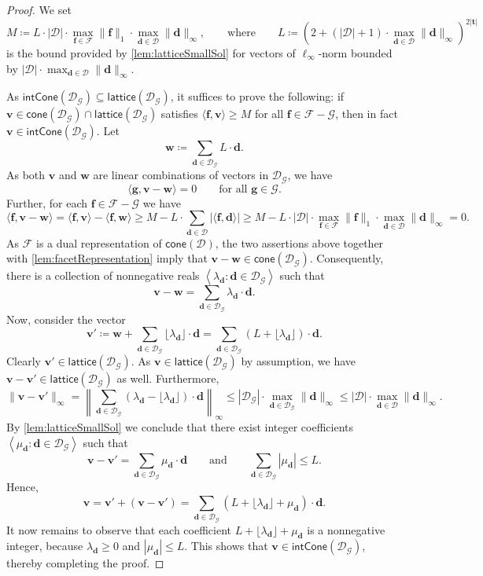 \documentclass{theoretics}
\renewcommand{\leq}{\leqslant}
\renewcommand{\geq}{\geqslant}
\newcommand{\Dd}{\mathcal{D}}
\newcommand{\tup}[1]{{\mathbf{#1}}}
\newcommand{\ww}{\tup w}
\newcommand{\tv}{\tup t}
\newcommand{\ff}{\tup f}
\renewcommand{\gg}{\tup g}
\newcommand{\dd}{\tup d}
\newcommand{\myvv}{\tup v} %
\newcommand{\mset}[1]{\left\langle #1\right\rangle}
\newcommand{\Ff}{\mathcal{F}}
\newcommand{\Gg}{\mathcal{G}}
\newcommand{\sca}[2]{\langle #1,#2\rangle}
\renewcommand{\setminus}{-}
\newcommand{\realcone}{\mathsf{cone}}
\newcommand{\intcone}{\mathsf{intCone}}
\newcommand{\lattice}{\mathsf{lattice}}
\begin{document}
\begin{proof}
 We set
 $$M\coloneqq L\cdot |\Dd|\cdot \max_{\ff\in \Ff}\|\ff\|_1\cdot \max_{\dd\in \Dd} \|\dd\|_\infty,\qquad \textrm{where}\qquad L\coloneqq \left(2+(|\Dd|+1)\cdot \max_{\dd\in \Dd} \|\dd\|_\infty\right)^{2|\tv|}$$
 is the bound provided by \cref{lem:latticeSmallSol} for vectors of $\ell_\infty$-norm bounded by $|\Dd|\cdot \max_{\dd\in \Dd} \|\dd\|_\infty$.

 As $\intcone(\Dd_\Gg)\subseteq \lattice(\Dd_\Gg)$, it suffices to prove the following: if $\myvv\in \realcone(\Dd_\Gg)\cap \lattice(\Dd_\Gg)$ satisfies $\sca{\ff}{\myvv}\geq M$ for all $\ff\in \Ff\setminus \Gg$, then in fact $\myvv\in \intcone(\Dd_\Gg)$. Let
 $$\ww\coloneqq \sum_{\dd\in \Dd_\Gg} L\cdot \dd.$$
 As both $\myvv$ and $\ww$ are linear combinations of vectors in $\Dd_\Gg$, we have
 $$\sca{\gg}{\myvv-\ww}=0\qquad\textrm{for all }\gg\in \Gg.$$
 Further, for each $\ff\in \Ff\setminus \Gg$ we have
 $$\sca{\ff}{\myvv-\ww}=\sca{\ff}{\myvv}-\sca{\ff}{\ww}\geq M-L\cdot \sum_{\dd\in \Dd} |\sca{\ff}{\dd}|\geq M-L\cdot |\Dd|\cdot \max_{\ff\in \Ff}\|\ff\|_1\cdot \max_{\dd\in \Dd} \|\dd\|_\infty=0.$$
 As $\Ff$ is a dual representation of $\realcone(\Dd)$, the two assertions above together with \cref{lem:facetRepresentation} imply that $\myvv-\ww\in \realcone(\Dd_\Gg)$. Consequently, there is a collection of nonnegative reals $\mset{\lambda_\dd\colon \dd\in \Dd_\Gg}$ such that
 $$\myvv-\ww=\sum_{\dd\in \Dd_\Gg} \lambda_\dd\cdot \dd.$$
 Now, consider the vector
 $$\myvv'\coloneqq \ww+\sum_{\dd\in \Dd_\Gg} \lfloor\lambda_\dd\rfloor\cdot \dd=\sum_{\dd\in \Dd_\Gg} (L+\lfloor\lambda_\dd\rfloor)\cdot \dd.$$
 Clearly $\myvv'\in \lattice(\Dd_\Gg)$. As $\myvv\in \lattice(\Dd_\Gg)$ by assumption, we have $\myvv-\myvv'\in \lattice(\Dd_\Gg)$ as well. Furthermore,
 $$\|\myvv-\myvv'\|_\infty = \left\|\sum_{\dd\in \Dd_\Gg} (\lambda_\dd-\lfloor \lambda_\dd\rfloor)\cdot \dd\right\|_\infty\leq |\Dd_\Gg|\cdot \max_{\dd\in \Dd_\Gg} \|\dd\|_\infty\leq |\Dd|\cdot \max_{\dd\in \Dd} \|\dd\|_\infty.$$
 By \cref{lem:latticeSmallSol} we conclude that there exist integer coefficients $\mset{\mu_\dd\colon \dd\in \Dd_\Gg}$ such that
 $$\myvv-\myvv'=\sum_{\dd\in \Dd_\Gg} \mu_\dd\cdot \dd\qquad \textrm{and}\qquad \sum_{\dd\in \Dd_\Gg} |\mu_\dd|\leq L.$$
 Hence,
 $$\myvv=\myvv'+(\myvv-\myvv')=\sum_{\dd\in \Dd_\Gg} (L+\lfloor\lambda_\dd\rfloor+\mu_\dd)\cdot \dd.$$
 It now remains to observe that each coefficient $L+\lfloor\lambda_\dd\rfloor+\mu_\dd$ is a nonnegative integer, because $\lambda_\dd\geq 0$ and $|\mu_\dd|\leq L$. This shows that $\myvv\in \intcone(\Dd_\Gg)$, thereby completing the proof.
\end{proof}
\end{document}
